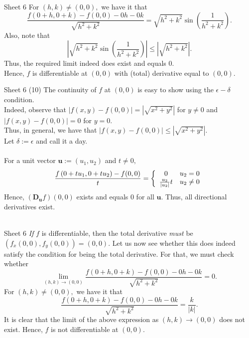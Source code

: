 \documentclass[handout, aspectratio=169]{beamer}
\begin{document}
\begin{frame}{Sheet 6}
	For $(h,k) \neq (0,0),$ we have it that
	\[\frac{f\left(0+h, 0+k\right)-f\left(0, 0\right)-0 h-0 k}{\sqrt{h^{2}+k^{2}}} = \sqrt{h^2 + k^2}\sin\left(\frac{1}{h^2 + k^2}\right).\]
	Also, note that
	\[\left|\sqrt{h^2 + k^2}\sin\left(\frac{1}{h^2 + k^2}\right)\right| \le \left|\sqrt{h^2 + k^2}\right|.\]
	Thus, the required limit indeed does exist and equals $0.$\\
	Hence, $f$ is differentiable at $(0,0)$ with (total) derivative equal to $(0, 0).$
\end{frame}

\begin{frame}{Sheet 6}
	(10) The continuity of $f$ at $(0, 0)$ is easy to show using the $\epsilon-\delta$ condition.\\
	Indeed, observe that $|f(x, y) - f(0, 0)| = \left|\sqrt{x^2 + y^2}\right|$ for $y \neq 0$ and $|f(x, y) - f(0, 0)| = 0$ for $y = 0.$\\
	Thus, in general, we have that $|f(x, y) - f(0, 0)| \le \left|\sqrt{x^2 + y^2}\right|.$ \\
	Let $\delta := \epsilon$ and call it a day.\\~\\
	For a unit vector $\textbf{u} := (u_1, u_2)$ and $t \neq 0,$
	\[\frac{f\left(0+t u_{1}, 0+t u_{2}\right)-f(0,0)}{t} = \left\{
		\begin{array}{c c}
			0 & u_2 = 0\\
			\frac{u_2}{|u_2|}t & u_2 \neq 0
		\end{array}
	\right.\]
	Hence, $\left(\mathbf{D_u} f\right)(0,0)$ exists and equals $0$ for all $\textbf{u}.$ Thus, all directional derivatives exist.\\~\\
\end{frame}
\begin{frame}{Sheet 6}
	\emph{If} $f$ is differentiable, then the total derivative \emph{must} be $(f_x(0, 0), f_y(0, 0)) = (0, 0).$ Let us now see whether this does indeed satisfy the condition for being the total derivative. For that, we must check whether
	\[\lim _{(h, k) \rightarrow(0,0)} \frac{f\left(0+h, 0+k\right)-f\left(0, 0\right)-0 h-0 k}{\sqrt{h^{2}+k^{2}}}=0.\]
	For $(h,k) \neq (0,0),$ we have it that
	\[\frac{f\left(0+h, 0+k\right)-f\left(0, 0\right)-0 h-0 k}{\sqrt{h^{2}+k^{2}}} = \frac{k}{|k|}.\]
	It is clear that the limit of the above expression as $(h, k) \to (0, 0)$ does not exist. Hence, $f$ is not differentiable at $(0, 0).$
\end{frame}
\end{document}
